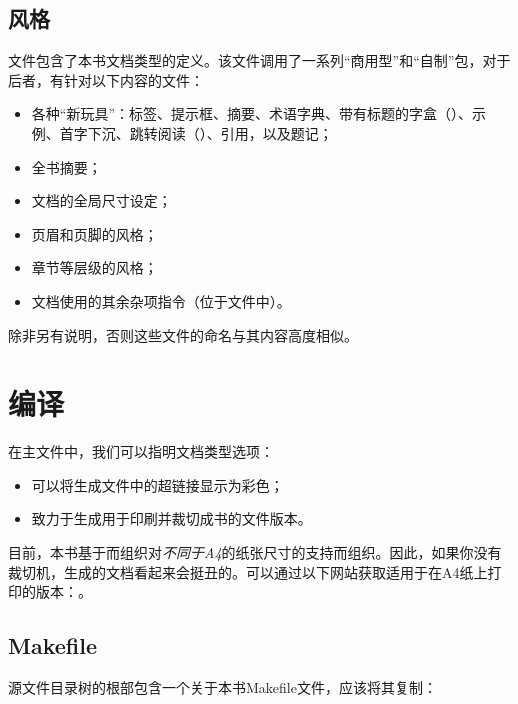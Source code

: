 \subsection{风格}

文件包含了本书文档类型的定义。该文件调用了一系列“商用型”和“自制”包，对于后者，有针对以下内容的文件：

\begin{itemize}
    \item 各种“新玩具”：标签、提示框、摘要、术语字典、带有标题的字盒（）、示例、首字下沉、跳转阅读（）、引用，以及题记；
    \item 全书摘要；
    \item 文档的全局尺寸设定；
    \item 页眉和页脚的风格；
    \item 章节等层级的风格；
    \item 文档使用的其余杂项指令（位于文件中）。
\end{itemize}

除非另有说明，否则这些文件的命名与其内容高度相似。

\section{编译}

在主文件中，我们可以指明文档类型选项：

\begin{itemize}
    \item {}可以将生成文件中的超链接显示为彩色；
    \item {}致力于生成用于印刷并裁切成书的文件版本。
\end{itemize}

\begin{exclamation}
目前，本书基于而组织对\emph{不同于A4}的纸张尺寸的支持而组织。因此，如果你没有裁切机，生成的文档看起来会挺丑的。可以通过以下网站获取适用于在A4纸上打印的版本：。
\end{exclamation}

\subsection{Makefile}

源文件目录树的根部包含一个关于本书Makefile文件，应该将其复制：


